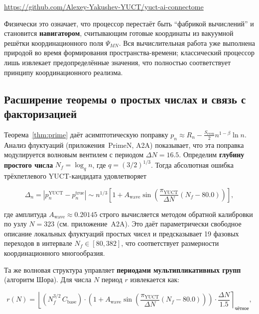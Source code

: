 \documentclass[12pt,a4paper]{article}
\theoremstyle{remark}
\newcommand{\piYUCT}{\pi_{\mathrm{YUCT}}}
\begin{document}
	\begin{center}
		\url{https://github.com/Alexey-Yakushev-YUCT/yuct-ai-connectome}
	\end{center}
	
	Физически это означает, что процессор перестаёт быть ``фабрикой вычислений'' и становится \textbf{навигатором}, считывающим готовые координаты из вакуумной решётки координационного поля \(\Psi_{MN}\). Вся вычислительная работа уже выполнена природой во время формирования пространства-времени; классический процессор лишь извлекает предопределённые значения, что полностью соответствует принципу координационного реализма.
	
	\subsection{Расширение теоремы о простых числах и связь с факторизацией}
	\label{subsec:prime-extension}
	
	Теорема~\ref{thm:prime} даёт асимптотическую поправку \(p_n \approx R_n - \frac{S_{\mathrm{even}}}{2} n^{1-\beta}\ln n\). Анализ флуктуаций (приложения~PrimeN, A2A) показывает, что эта поправка модулируется волновым вентилем с периодом \(\Delta N = 16.5\). Определим \textbf{глубину простого числа} \(N_f = \log_q n\), где \(q = (3/2)^{1/3}\). Тогда абсолютная ошибка трёхпетлевого YUCT-кандидата удовлетворяет
	
	\begin{equation}
		\Delta_n = \left| p_n^{\mathrm{YUCT}} - p_n^{\mathrm{true}} \right|
		\sim n^{1/3} \left[ 1 + A_{\text{wave}} \sin\!\left( \frac{\piYUCT}{\Delta N} (N_f - 80.0) \right) \right],
		\label{eq:prime_wave}
	\end{equation}
	
	где амплитуда \(A_{\text{wave}} \approx 0.20145\) строго вычисляется методом обратной калибровки по узлу \(N=323\) (см. приложение~A2A). Это даёт параметрически свободное описание локальных флуктуаций простых чисел и предсказывает 19 фазовых переходов в интервале \(N_f \in [80, 382]\), что соответствует размерности координационного многообразия.
	
	Та же волновая структура управляет \textbf{периодами мультипликативных групп} (алгоритм Шора). Для числа \(N\) период \(r\) извлекается как:
	
	\begin{equation}
		r(N) = \left\lfloor (N_f^{3/2} \, C_{\text{base}}) \cdot
		\left(1 + A_{\text{wave}} \sin\left( \frac{\piYUCT}{\Delta N} (N_f - 80.0) \right) \right) \cdot \frac{\Delta N}{1.5} \right\rceil_{\text{чётное}},
		\label{eq:shor_period}
	\end{equation}
	
\end{document}
